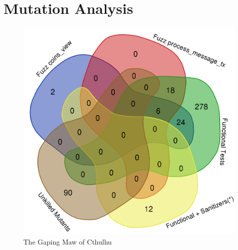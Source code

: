 \section{Mutation Analysis}

\begin{figure}
\vspace{2mm}
\includegraphics[width=1.9\columnwidth]{kill_pre_valgrind.png}
\caption{The Gaping Maw of Cthulhu}
\end{figure}